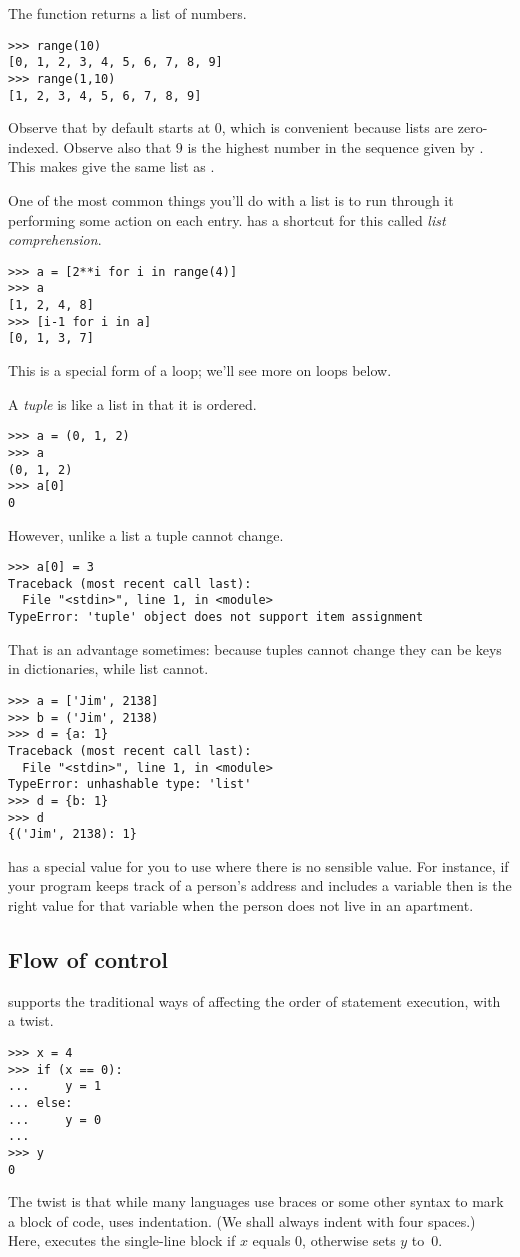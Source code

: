 The function  returns a list of numbers.
\begin{lstlisting}[style=python]
 >>> range(10)
[0, 1, 2, 3, 4, 5, 6, 7, 8, 9]
>>> range(1,10)
[1, 2, 3, 4, 5, 6, 7, 8, 9] 
\end{lstlisting}
Observe that by default  starts at $0$, which
is convenient because lists are zero-indexed.
Observe also that $9$ is the highest number in the sequence 
given by .
This makes  give 
the same list as .

One of the most common things you'll do with a list is to run through
it performing some action on each entry.
\python{} has a shortcut for this called \textit{list comprehension}.
\begin{lstlisting}
>>> a = [2**i for i in range(4)]
>>> a
[1, 2, 4, 8]
>>> [i-1 for i in a]
[0, 1, 3, 7]
\end{lstlisting}
This is a special form of a loop; we'll see more on loops below.

A \textit{tuple} is like a list in that it is ordered.
\begin{lstlisting}[style=python]
>>> a = (0, 1, 2)
>>> a
(0, 1, 2)
>>> a[0]
0
\end{lstlisting}
However, unlike a list a tuple cannot change.
\begin{lstlisting}[style=python]
>>> a[0] = 3
Traceback (most recent call last):
  File "<stdin>", line 1, in <module>
TypeError: 'tuple' object does not support item assignment
\end{lstlisting}
That is an advantage sometimes:
because tuples cannot change they can be keys in dictionaries, while
list cannot.
\begin{lstlisting}[style=python]
>>> a = ['Jim', 2138]
>>> b = ('Jim', 2138)
>>> d = {a: 1}
Traceback (most recent call last):
  File "<stdin>", line 1, in <module>
TypeError: unhashable type: 'list'
>>> d = {b: 1}
>>> d
{('Jim', 2138): 1}
\end{lstlisting}

\python{} has a special value  for you to use
where there is no sensible value.
For instance, if your program keeps track of a person's address and
includes a variable  then  is
the right value for that variable when the person does not live in an
apartment.



\subsection{Flow of control}
\python{} supports the traditional ways of affecting the order of 
statement execution, with a twist.
\begin{lstlisting}[style=python]
>>> x = 4
>>> if (x == 0):
...     y = 1
... else:
...     y = 0
... 
>>> y
0
\end{lstlisting}
The twist is that while many languages use braces or some other syntax to
mark a block of code, \python{} uses indentation.
(We shall always indent with four spaces.)
Here, \python{} executes the single-line block  if $x$
equals $0$, otherwise \python{} sets $y$ to~$0$. 

